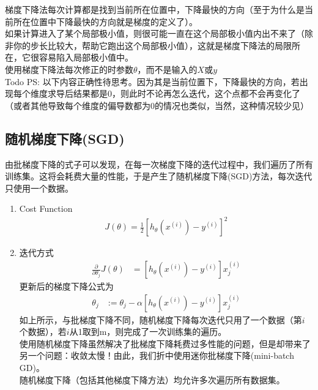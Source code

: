 \begin{enumerate}
	梯度下降法每次计算都是找到当前所在位置中，下降最快的方向（至于为什么是当前所在位置中下降最快的方向就是梯度的定义了）。 \\
	如果计算进入了某个局部极小值，则很可能一直在这个局部极小值内出不来了（除非你的步长比较大，帮助它跑出这个局部极小值），这就是梯度下降法的局限所在，它很容易陷入局部极小值中。 \\
	使用梯度下降法每次修正的时参数$\theta$，而不是输入的$X$或$y$ \\

	Todo PS: 以下内容正确性待思考。因为其是当前位置下，下降最快的方向，若出现每个维度求导后结果都是0，则此时不论再怎么迭代，这个点都不会再变化了（或者其他导致每个维度的偏导数都为0的情况也类似，当然，这种情况较少见）
\end{enumerate}


\subsection{随机梯度下降(SGD)}
由批梯度下降的式子可以发现，在每一次梯度下降的迭代过程中，我们遍历了所有训练集。这将会耗费大量的性能，于是产生了随机梯度下降(SGD)方法，每次迭代只使用一个数据。 \\
\begin{enumerate}
	\item Cost Function
	\begin{equation}\begin{aligned}
		J(\theta) = \frac{1}{2} \left[h_{\theta} {(x^{(i)})} - y^{(i)}\right]^2
	\end{aligned}\end{equation}

	\item 迭代方式
	\begin{equation}\begin{aligned}
	      \frac{\partial} {\partial \theta_j} J(\theta) &= \left[ h_\theta(x^{(i)}) - y^{(i)} \right]x_j^{(i)}
	\end{aligned}\end{equation}
	更新后的梯度下降公式为
	\begin{equation}\begin{aligned}
		\theta_j &:= \theta_j - \alpha\left[ h_\theta(x^{(i)}) - y^{(i)} \right]x_j^{(i)}
	\end{aligned}\end{equation}
	如上所示，与批梯度下降不同，随机梯度下降每次迭代只用了一个数据（第$i$个数据），若$i$从1取到m，则完成了一次训练集的遍历。\\
	使用随机梯度下降虽然解决了批梯度下降耗费过多性能的问题，但是却带来了另一个问题：收敛太慢！由此，我们折中使用迷你批梯度下降(mini-batch GD)。\\
	随机梯度下降（包括其他梯度下降方法）均允许多次遍历所有数据集。
\end{enumerate}

